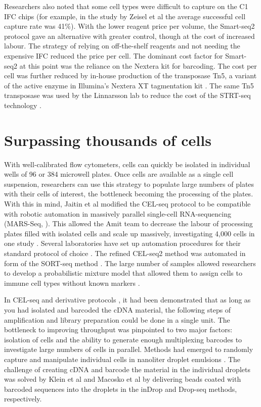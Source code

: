 Researchers also noted that some cell types were difficult to capture on the C1 IFC chips (for example, in the study by Zeisel et al \cite{Zeisel2015-mk} the average successful cell capture rate was 41\%). With the lower reagent price per volume, the Smart-seq2 protocol gave an alternative with greater control, though at the cost of increased labour. The strategy of relying on off-the-shelf reagents and not needing the expensive IFC reduced the price per cell. The dominant cost factor for Smart-seq2 at this point was the reliance on the Nextera kit for barcoding. The cost per cell was further reduced by in-house production of the transposase Tn5, a variant of the active enzyme in Illumina’s Nextera XT tagmentation kit \cite{Picelli2014-ni}. The same Tn5 transposase was used by the Linnarsson lab to reduce the cost of the STRT-seq technology \cite{Islam2014-dx}.

\section{Surpassing thousands of cells}

With well-calibrated flow cytometers, cells can quickly be isolated in individual wells of 96 or 384 microwell plates. Once cells are available as a single cell suspension, researchers can use this strategy to populate large numbers of plates with their cells of interest, the bottleneck becoming the processing of the plates. With this in mind, Jaitin et al modified the CEL-seq protocol to be compatible with robotic automation in massively parallel single-cell RNA-sequencing (MARS-Seq, \citet{Jaitin2014-pk}). This allowed the Amit team to decrease the labour of processing plates filled with isolated cells and scale up massively, investigating 4,000 cells in one study \cite{Jaitin2014-pk}. Several laboratories have set up automation procedures for their standard protocol of choice \cite{Zeisel2015-mk, Soumillon2014-mf}. The refined CEL-seq2 method \cite{Hashimshony2016-ul} was automated in form of the SORT-seq method \cite{Muraro2016-zt}. The large number of samples allowed researchers to develop a probabilistic mixture model that allowed them to assign cells to immune cell types without known markers \cite{Jaitin2014-pk}.

In CEL-seq and derivative protocols \cite{Hashimshony2012-am, Jaitin2014-pk, Hashimshony2016-ul, Velten2015-ve}, it had been demonstrated that as long as you had isolated and barcoded the cDNA material, the following steps of amplification and library preparation could be done in a single unit. The bottleneck to improving throughput was pinpointed to two major factors: isolation of cells and the ability to generate enough multiplexing barcodes to investigate large numbers of cells in parallel. Methods had emerged to randomly capture and manipulate individual cells in nanoliter droplet emulsions \cite{Mazutis2013-rd}. The challenge of creating cDNA and barcode the material in the individual droplets was solved by Klein et al \cite{Klein2015-ti} and Macosko et al \cite{Macosko2015-jb} by delivering beads coated with barcoded sequences into the droplets in the inDrop and Drop-seq methods, respectively.

